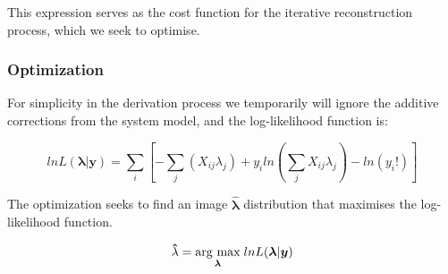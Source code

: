 This expression serves as the cost function for the iterative reconstruction process, which we seek to optimise. 


\subsubsection{Optimization}

For simplicity in the derivation process we temporarily will ignore the additive corrections from the system model, and the log-likelihood function is:

\begin{equation}
    lnL(\bm{\lambda}|\bm{y})  = \sum_i\left[  -\sum_j (X_{ij} \lambda_j) + y_i ln(\sum_j X_{ij} \lambda_j) - ln({y_i}!) \right]
    \label{eqn:simpleloglikelihood}
\end{equation}

The optimization seeks to find an image $\bm\hat\lambda$ distribution that maximises the log-likelihood function.

\begin{equation}
\bm\hat\lambda = \underset{\bm{\lambda}}{\operatorname{arg}\,\operatorname{max}}\;lnL(\bm{\lambda}|\bm{y})
\end{equation}













